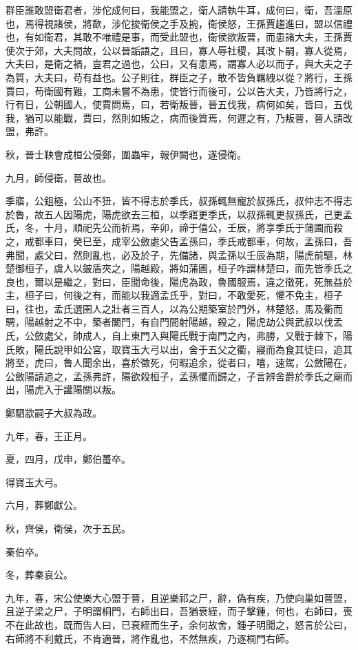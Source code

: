 \begin{pinyinscope}
群臣誰敢盟衛君者，涉佗成何曰，我能盟之，衛人請執牛耳，成何曰，衛，吾溫原也，焉得視諸侯，將歃，涉佗捘衛侯之手及捥，衛侯怒，王孫賈趨進曰，盟以信禮也，有如衛君，其敢不唯禮是事，而受此盟也，衛侯欲叛晉，而患諸大夫，王孫賈使次于郊，大夫問故，公以晉詬語之，且曰，寡人辱社稷，其改卜嗣，寡人從焉，大夫曰，是衛之禍，豈君之過也，公曰，又有患焉，謂寡人必以而子，與大夫之子為質，大夫曰，苟有益也。公子則往，群臣之子，敢不皆負羈絏以從？將行，王孫賈曰，苟衛國有難，工商未嘗不為患，使皆行而後可，公以告大夫，乃皆將行之，行有日，公朝國人，使賈問焉，曰，若衛叛晉，晉五伐我，病何如矣，皆曰，五伐我，猶可以能戰，賈曰，然則如叛之，病而後質焉，何遲之有，乃叛晉，晉人請改盟，弗許。

秋，晉士鞅會成桓公侵鄭，圍蟲牢，報伊闕也，遂侵衛。

九月，師侵衛，晉故也。

季寤，公鉏極，公山不狃，皆不得志於季氏，叔孫輒無寵於叔孫氏，叔仲志不得志於魯，故五人因陽虎，陽虎欲去三桓，以季寤更季氏，以叔孫輒更叔孫氏，己更孟氏，冬，十月，順祀先公而祈焉，辛卯，禘于僖公，壬辰，將享季氏于蒲圃而殺之，戒都車曰，癸巳至，成宰公斂處父告孟孫曰，季氏戒都車，何故，孟孫曰，吾弗聞，處父曰，然則亂也，必及於子，先備諸，與孟孫以壬辰為期，陽虎前驅，林楚御桓子，虞人以鈹盾夾之，陽越殿，將如蒲圃，桓子咋謂林楚曰，而先皆季氏之良也，爾以是繼之，對曰，臣聞命後，陽虎為政，魯國服焉，違之徵死，死無益於主，桓子曰，何後之有，而能以我適孟氏乎，對曰，不敢愛死，懼不免主，桓子曰，往也，孟氏選圉人之壯者三百人，以為公期築室於門外，林楚怒，馬及衢而騁，陽越射之不中，築者闔門，有自門間射陽越，殺之，陽虎劫公與武叔以伐孟氏，公斂處父，帥成人，自上東門入與陽氏戰于南門之內，弗勝，又戰于棘下，陽氏敗，陽氏說甲如公宮，取寶玉大弓以出，舍于五父之衢，寢而為食其徒曰，追其將至，虎曰，魯人聞余出，喜於徵死，何暇追余，從者曰，嘻，速駕，公斂陽在，公斂陽請追之，孟孫弗許，陽欲殺桓子，孟孫懼而歸之，子言辨舍爵於季氏之廟而出，陽虎入于讙陽關以叛。

鄭駟歂嗣子大叔為政。

九年，春，王正月。

夏，四月，戊申，鄭伯蠆卒。

得寶玉大弓。

六月，葬鄭獻公。

秋，齊侯，衛侯，次于五民。

秦伯卒。

冬，葬秦哀公。

九年，春，宋公使樂大心盟于晉，且逆樂祁之尸，辭，偽有疾，乃使向巢如晉盟，且逆子梁之尸，子明謂桐門，右師出曰，吾猶衰絰，而子擊鍾，何也，右師曰，喪不在此故也，既而告人曰，已衰絰而生子，余何故舍，鍾子明聞之，怒言於公曰，右師將不利戴氏，不肯適晉，將作亂也，不然無疾，乃逐桐門右師。


\end{pinyinscope}
